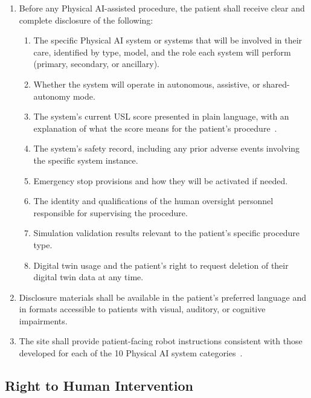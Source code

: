 \documentclass[11pt,letterpaper]{article}
\begin{document}
\begin{enumerate}[label=(\alph*)]
\item Before any Physical AI-assisted procedure, the patient shall receive clear
  and complete disclosure of the following:
  \begin{enumerate}[label=(\arabic*)]
  \item The specific Physical AI system or systems that will be involved in
    their care, identified by type, model, and the role each system will
    perform (primary, secondary, or ancillary).
  \item Whether the system will operate in autonomous, assistive, or
    shared-autonomy mode.
  \item The system's current USL score presented in plain language, with an
    explanation of what the score means for the patient's
    procedure~\cite{usl2026}.
  \item The system's safety record, including any prior adverse events involving
    the specific system instance.
  \item Emergency stop provisions and how they will be activated if needed.
  \item The identity and qualifications of the human oversight personnel
    responsible for supervising the procedure.
  \item Simulation validation results relevant to the patient's specific
    procedure type.
  \item Digital twin usage and the patient's right to request deletion of their
    digital twin data at any time.
  \end{enumerate}

\item Disclosure materials shall be available in the patient's preferred
  language and in formats accessible to patients with visual, auditory, or
  cognitive impairments.

\item The site shall provide patient-facing robot instructions consistent with
  those developed for each of the 10 Physical AI system
  categories~\cite{patientinstructions2026}.
\end{enumerate}

\subsection{Right to Human Intervention}
\end{document}

